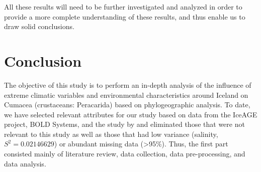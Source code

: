 All these results will need to be further investigated and analyzed in order to provide a more complete understanding of these results, and thus enable us to draw solid conclusions.

\section{Conclusion}\label{conclusion}

The objective of this study is to perform an in-depth analysis of the influence of extreme climatic variables and environmental characteristics around Iceland on Cumacea (crustaceans: Peracarida) based on phylogeographic analysis. To date, we have selected relevant attributes for our study based on data from the IceAGE project, BOLD Systems, and the study by \cite{uhlir_adding_2021} and eliminated those that were not relevant to this study as well as those that had low variance (salinity, \( S^2 = 0.02146629 \)) or abundant missing data (>95\%). Thus, the first part consisted mainly of literature review, data collection, data pre-processing, and data analysis.
